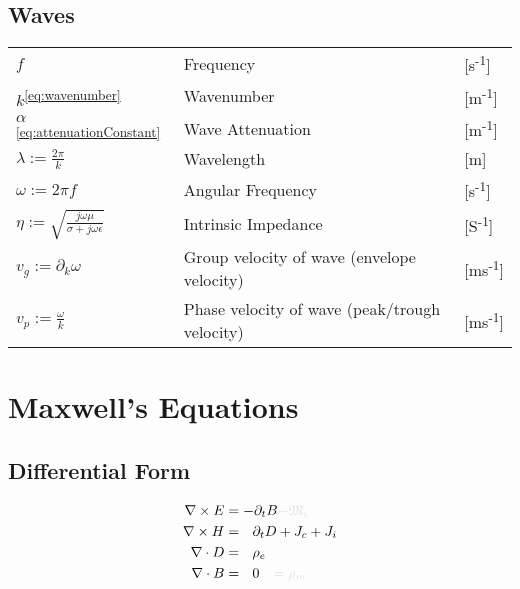 \documentclass{article}
\numberwithin{equation}{section}
\begin{document}
\subsection*{Waves}
\begin{tabular}{ m{7em} m{24em} m{4em} }
    \( \displaystyle f \) & Frequency & [s\textsuperscript{-1}] \\
    \( \displaystyle k \)\textsuperscript{\eqref{eq:wavenumber}} & Wavenumber & [m\textsuperscript{-1}]  \\
    \( \displaystyle \alpha \)\textsuperscript{\eqref{eq:attenuationConstant}} & Wave Attenuation & [m\textsuperscript{-1}]  \\
    \( \displaystyle \lambda := \frac{2 \pi}{k} \) & Wavelength & [m] \\
    \( \displaystyle \omega := 2 \pi f \) & Angular Frequency & [s\textsuperscript{-1}] \\
    \( \displaystyle \eta := \sqrt{\frac{j \omega \mu}{\sigma + j \omega \epsilon}} \) & Intrinsic Impedance & [S\textsuperscript{-1}] \\
    \( \displaystyle v_g := \partial_k \omega \) & Group velocity of wave (envelope velocity) & [ms\textsuperscript{-1}]  \\
    \( \displaystyle v_p := \frac{\omega}{k} \) & Phase velocity of wave (peak/trough velocity) & [ms\textsuperscript{-1}]  \\
\end{tabular}
\normalsize
\newpage
\section{Maxwell's Equations}
\subsection{Differential Form}
    \begin{subequations}\label{eq:Maxwell}
        \begin{align}
            \nabla \times E &= - \partial_t B \begingroup \textcolor{vanish}{- \mathfrak{M}_i } \endgroup \label{eq:MaxwellFaraday} \\
            \nabla \times H &= \ \ \partial_t D + J_{c} + J_{i} \label{eq:AmpereMaxwell} \\
            \nabla \cdot D &= \ \ \rho_e \label{eq:GaussElectric} \\
            \nabla \cdot B &= \ \ 0 \begingroup \textcolor{vanish}{\quad = \rho_m} \endgroup \label{eq:GaussMagnetic}
        \end{align}
    \end{subequations}
\end{document}

